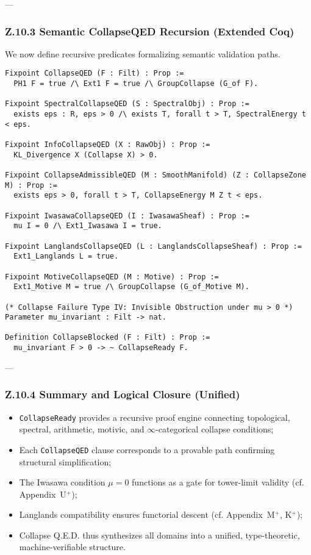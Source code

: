 \documentclass[11pt]{article}
\begin{document}
---

\subsubsection*{Z.10.3 Semantic CollapseQED Recursion (Extended Coq)}

We now define recursive predicates formalizing semantic validation paths.

\begin{lstlisting}[language=Coq]
Fixpoint CollapseQED (F : Filt) : Prop :=
  PH1 F = true /\ Ext1 F = true /\ GroupCollapse (G_of F).

Fixpoint SpectralCollapseQED (S : SpectralObj) : Prop :=
  exists eps : R, eps > 0 /\ exists T, forall t > T, SpectralEnergy t < eps.

Fixpoint InfoCollapseQED (X : RawObj) : Prop :=
  KL_Divergence X (Collapse X) > 0.

Fixpoint CollapseAdmissibleQED (M : SmoothManifold) (Z : CollapseZone M) : Prop :=
  exists eps > 0, forall t > T, CollapseEnergy M Z t < eps.

Fixpoint IwasawaCollapseQED (I : IwasawaSheaf) : Prop :=
  mu I = 0 /\ Ext1_Iwasawa I = true.

Fixpoint LanglandsCollapseQED (L : LanglandsCollapseSheaf) : Prop :=
  Ext1_Langlands L = true.

Fixpoint MotiveCollapseQED (M : Motive) : Prop :=
  Ext1_Motive M = true /\ GroupCollapse (G_of_Motive M).

(* Collapse Failure Type IV: Invisible Obstruction under mu > 0 *)
Parameter mu_invariant : Filt -> nat.

Definition CollapseBlocked (F : Filt) : Prop :=
  mu_invariant F > 0 -> ~ CollapseReady F.

\end{lstlisting}

---

\subsubsection*{Z.10.4 Summary and Logical Closure (Unified)}

\begin{itemize}
  \item \texttt{CollapseReady} provides a recursive proof engine connecting topological, spectral, arithmetic, motivic, and $\infty$-categorical collapse conditions;
  \item Each \texttt{CollapseQED} clause corresponds to a provable path confirming structural simplification;
  \item The Iwasawa condition \( \mu = 0 \) functions as a gate for tower-limit validity (cf. Appendix~U$^+$);
  \item Langlands compatibility ensures functorial descent (cf. Appendix~M$^+$, K$^+$);
  \item Collapse Q.E.D. thus synthesizes all domains into a unified, type-theoretic, machine-verifiable structure.
\end{itemize}
\end{document}

